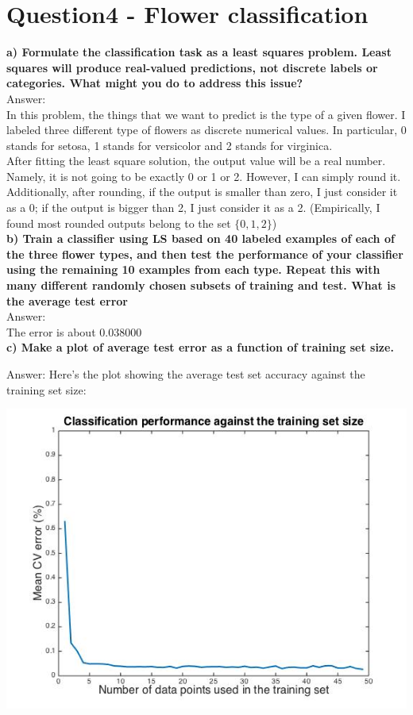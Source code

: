 \documentclass[paper=a4, fontsize=11pt]{scrartcl} %
\numberwithin{equation}{section} %
\numberwithin{figure}{section} %
\numberwithin{table}{section} %
\begin{document}
\section*{Question4 - Flower classification}
\textbf{a) Formulate the classification task as a least squares problem. Least squares will produce real-valued predictions, not discrete labels or categories. What might you do to address this issue?}\\
Answer: \\
In this problem, the things that we want to predict is the type of a given flower. I labeled three different type of flowers as discrete numerical values. In particular, 0 stands for setosa, 1 stands for versicolor and 2 stands for virginica. \\
After fitting the least square solution, the output value will be a real number. Namely, it is not going to be exactly 0 or 1 or 2. However, I can simply round it. Additionally, after rounding, if the output is smaller than zero, I just consider it as a 0; if the output is bigger than 2, I just consider it as a 2. (Empirically, I found most rounded outputs belong to the set $\{0, 1, 2\}$)\\


\textbf{b) Train a classifier using LS based on 40 labeled examples of each of the three flower types, and then test the performance of your classifier using the remaining 10 examples from each type. Repeat this with many different randomly chosen subsets of training and test. What is the average test error}\\
Answer: \\
The error is about $0.038000$\\


\textbf{c) Make a plot of average test error as a function of training set size.}

Answer: Here's the plot showing the average test set accuracy against the training set size: 
\begin{center}
\includegraphics[scale=.5]{error_trainSize.jpg}
\end{center}
\end{document}
